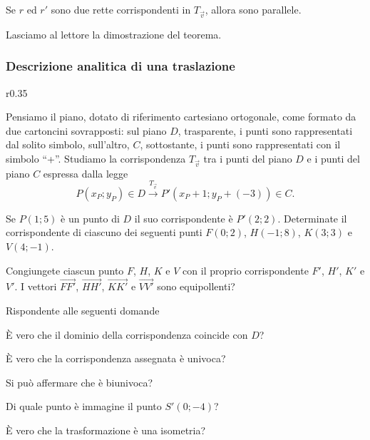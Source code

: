 \begin{teorema}
Se $r$ ed $r'$ sono due rette corrispondenti in $T_{\vec{v}}$, allora sono parallele.
\end{teorema}

Lasciamo al lettore la dimostrazione del teorema.
\pagebreak
\subsubsection{Descrizione analitica di una traslazione}

\setlength{\intextsep}{3pt plus 2.0pt minus 2.0pt}
\begin{wrapfigure}{r}{0.35\textwidth}
	\centering
\end{wrapfigure}
Pensiamo il piano, dotato di riferimento cartesiano ortogonale, come formato da due cartoncini sovrapposti: sul piano $D$, trasparente, i punti sono rappresentati dal solito simbolo, sull'altro, $C$, sottostante, i punti sono rappresentati con il simbolo ``+''.
Studiamo la corrispondenza $T_{\vec{v}}$ tra i punti del piano $D$ e i punti del piano $C$ espressa dalla legge
\[P(x_P;y_P)\in D \overset{T_{\vec{v}}}\rightarrow P'(x_P+1;y_P+(-3))\in C.\]


Se $P(1;5)$ è un punto di $D$ il suo corrispondente è $P'(2;2)$. Determinate il corrispondente di ciascuno dei seguenti punti $F(0;2)$, $H(-1;8)$, $K(3;3)$ e $V(4;-1)$.

Congiungete ciascun punto $F$, $H$, $K$ e $V$ con il proprio corrispondente $F'$, $H'$, $K'$ e $V'$. I vettori $\overrightarrow{FF'}$, $\overrightarrow{HH'}$, $\overrightarrow{KK'}$ e $\overrightarrow{VV'}$ sono equipollenti?

Rispondente alle seguenti domande
\begin{itemize*}
\item \`E vero che il dominio della corrispondenza coincide con $D$?
\item \`E vero che la corrispondenza assegnata è univoca?
\item Si può affermare che è biunivoca?
\item Di quale punto è immagine il punto $S'(0;-4)$?
\item \`E vero che la trasformazione è una isometria?
\end{itemize*}

